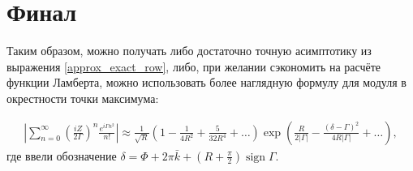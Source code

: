 \documentclass[a4paper, 12pt]{article}
\DeclareMathOperator*{\sign}{sign}
\newenvironment{eqw}{\begin{equation} \begin{aligned}}   
    {\end{aligned}    \end{equation}}
\begin{document}
\section*{Финал}
Таким образом, можно получать либо достаточно точную асимптотику из выражения \eqref{approx_exact_row}, либо, при желании сэкономить на расчёте функции Ламберта, можно использовать более наглядную формулу для модуля в окрестности точки максимума:

\begin{eqw}
    \left|\sum\limits_{n=0}^{\infty}\left(\frac{iZ}{2\Gamma}\right)^n  \frac{e^{i\Gamma n^2}}{n!} \right|\approx 
    \frac{1}{\sqrt{R}}\left(1-\frac{1}{4 R^2} + \frac{5}{32 R^4}+\dots\right)
    \exp\left(\frac{R}{2|\Gamma|} - \frac{\left(\delta -\Gamma\right)^2}{4R|\Gamma|}+\dots\right),
\end{eqw}
где ввели обозначение $\delta = \Phi + 2\pi \bar k +  \left(R+\frac{\pi}{2} \right)\sign\Gamma$.


\nocite{*}

\end{document}
